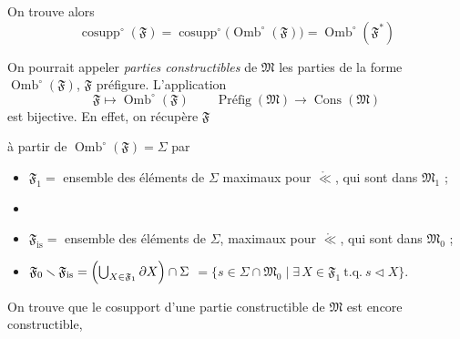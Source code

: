 \documentclass[11pt,a4paper]{article}
\begin{document}

On trouve alors
\[
  \boxed{\operatorname{cosupp}^{\circ}(\mathfrak{F}) = \operatorname{cosupp}^{\circ}\bigl(\operatorname{Omb}^{\circ}(\mathfrak{F})\bigr) = \operatorname{Omb}^{\circ}(\mathfrak{F}^{*})}
\]

On pourrait appeler \emph{parties constructibles} de $\mathfrak{M}$ les parties de la forme $\operatorname{Omb}^{\circ}(\mathfrak{F})$, $\mathfrak{F}$ préfigure.  L'application
\[
  \mathfrak{F} \longmapsto \operatorname{Omb}^{\circ}(\mathfrak{F}) \qquad \operatorname{Préfig}(\mathfrak{M}) \to \operatorname{Cons}(\mathfrak{M})
\]
est bijective. En effet, on récupère $\mathfrak{F}$


à partir de $\operatorname{Omb}^{\circ}(\mathfrak{F}) = \Sigma$ par
\begin{itemize}
  \item $\mathfrak{F}_1 = $ ensemble des éléments de  $\Sigma$ maximaux pour $\mathring{\ll}$, qui sont dans $\mathfrak{M}_1$ ;
  \item {}
  \item $\mathfrak{F}_{\mathrm{is}} = $ ensemble des éléments de $\Sigma$, maximaux pour $\mathring{\ll}$, qui sont dans $\mathfrak{M}_0$ ;
  \item $\mathfrak{F}_0 \smallsetminus \mathfrak{F}_{\mathrm{is}} = \Bigl( \bigcup_{X \in \mathfrak{F}_1} \partial X \Bigr) \cap \Sigma$
    $= \{ s \in \Sigma \cap \mathfrak{M}_0 \mid \exists\, X \in \mathfrak{F}_1 \ \text{t.q.}\ s \lhd X \}$.
\end{itemize}

On trouve que le cosupport d'une partie constructible de $\mathfrak{M}$ est encore constructible,

\end{document}
